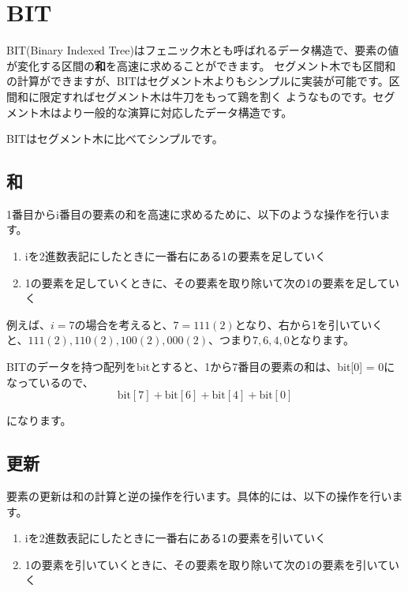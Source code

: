 \documentclass{jlreq}
\begin{document}
\section{BIT}
BIT(Binary Indexed Tree)はフェニック木とも呼ばれるデータ構造で、要素の値が変化する区間の\textbf{和}を高速に求めることができます。
セグメント木でも区間和の計算ができますが、BITはセグメント木よりもシンプルに実装が可能です。区間和に限定すればセグメント木は牛刀をもって鶏を割く
ようなものです。セグメント木はより一般的な演算に対応したデータ構造です。

BITはセグメント木に比べてシンプルです。

\subsection{和}

1番目からi番目の要素の和を高速に求めるために、以下のような操作を行います。

\begin{enumerate}
	\item iを2進数表記にしたときに一番右にある1の要素を足していく
	\item 1の要素を足していくときに、その要素を取り除いて次の1の要素を足していく
\end{enumerate}

例えば、$i = 7$の場合を考えると、$7 = 111(2)$となり、右から1を引いていくと、$111(2), 110(2), 100(2), 000(2)$、つまり$7, 6, 4, 0$となります。

BITのデータを持つ配列をbitとすると、1から7番目の要素の和は、bit[0] = 0になっているので、
\begin{equation*}
	\text{bit}[7] + \text{bit}[6] + \text{bit}[4] + \text{bit}[0]
\end{equation*}

になります。

\subsection{更新}

要素の更新は和の計算と逆の操作を行います。具体的には、以下の操作を行います。

\begin{enumerate}
	\item iを2進数表記にしたときに一番右にある1の要素を引いていく
	\item 1の要素を引いていくときに、その要素を取り除いて次の1の要素を引いていく
\end{enumerate}
\end{document}
